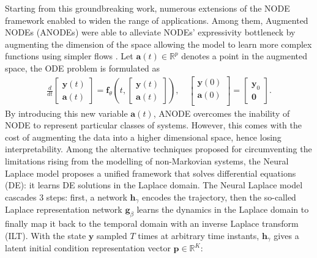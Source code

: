 \documentclass[pmlr]{jmlr}%
\newcommand{\LMcomment}[1]{{\bfseries \color{orange} [LM: #1]}}
\newcommand{\TM}[2]{{\bfseries \color{red} [thib: #1]}}
\begin{document}
Starting from this groundbreaking work, numerous extensions of the NODE framework enabled to widen the range of applications. Among them, Augmented NODEs (ANODEs) \citep{dupont2019augmented} were able to alleviate NODEs' expressivity bottleneck by augmenting the dimension of the space allowing the model to learn more complex functions using simpler flows \citep{dupont2019augmented}. Let $\mathbf{a}(t) \in \mathbb{R}^p$ denotes a point in the augmented space, the ODE problem is formulated as 
%
\begin{equation}
\begin{aligned}
\frac{d}{dt}
\begin{bmatrix} 
	\mathbf{y}(t)\\
	\mathbf{a}(t)
\end{bmatrix} = \mathbf{f}_{\theta} 
\left(t,
\begin{bmatrix} 
	\mathbf{y}(t)\\
	\mathbf{a}(t)
\end{bmatrix}
 \right), \quad 
\begin{bmatrix} 
	\mathbf{y}(0)\\
	\mathbf{a}(0)\\
\end{bmatrix} = 
\begin{bmatrix} 
	\mathbf{y}_0\\
	\mathbf{0}
\end{bmatrix}.
\end{aligned}
\end{equation} 
%
By introducing this new variable $\mathbf{a}(t)$, ANODE overcomes the inability of NODE to represent particular classes of systems. However, this comes with the cost of augmenting the data into a higher dimensional space, hence losing interpretability. Among the alternative techniques proposed for circumventing the limitations rising from the modelling of non-Markovian systems, the Neural Laplace model \citep{neural_laplace} proposes a unified framework that solves differential equations (DE): it learns DE solutions in the Laplace domain. The Neural Laplace model cascades 3 steps: first, a network $\mathbf{h}_{\gamma}$ encodes the trajectory, then the so-called Laplace representation network $\mathbf{g}_{\beta}$ learns the dynamics in the Laplace domain to finally map it back to the temporal domain with an inverse Laplace transform (ILT). With the state $\mathbf{y}$ sampled $T$ times at arbitrary time instants, $\mathbf{h}_{\gamma}$ gives a latent initial condition representation vector $\mathbf{p} \in \mathbb{R}^K$:
\end{document}
